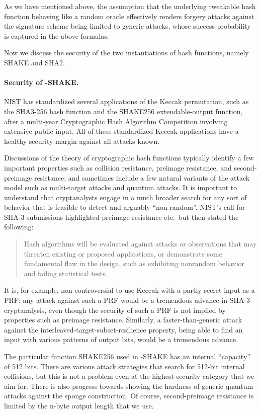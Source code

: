 As we have mentioned above, the assumption that the underlying tweakable hash function behaving like a random oracle effectively renders forgery attacks against the signature scheme being limited to generic attacks, whose success probability is captured in the above formulas. 

Now we discuss the security of the two instantiations of hash functions, namely \textsf{SHAKE} and \textsf{SHA2}.

\paragraph{Security of \SPHINCSA-SHAKE.}

NIST has standardized several applications of the Keccak permutation, such as the SHA3-256 hash function and the SHAKE256 extendable-output function, after a multi-year Cryptographic Hash Algorithm Competition involving extensive public input. All of these standardized Keccak applications have a healthy security margin against all attacks known.

Discussions of the theory of cryptographic hash functions typically identify a few important properties such as collision resistance, preimage resistance, and second-preimage resistance; and sometimes include a few natural variants of the attack model such as multi-target attacks and quantum attacks. It is important to understand that cryptanalysts engage in a much broader search for any sort of behavior that is feasible to detect and arguably ``non-random''. NIST's call for SHA-3 submissions highlighted preimage resistance etc.~but then stated the following:

\begin{quote}
    Hash algorithms will be evaluated against attacks or observations that may threaten existing or proposed applications, or demonstrate some fundamental flaw in the design, such as exhibiting nonrandom behavior and failing statistical tests.
\end{quote}
It is, for example, non-controversial to use Keccak with a partly secret input as a PRF: any attack against such a PRF would be a tremendous advance in SHA-3 cryptanalysis, even though the security of such a PRF is not implied by properties such as preimage resistance. Similarly, a faster-than-generic attack against the interleaved-target-subset-resilience property, being able to find an input with various patterns of output bits, would be a tremendous advance.

The particular function SHAKE256 used in \SPHINCSA-SHAKE has an internal “capacity” of 512 bits. There are various attack strategies that search for 512-bit internal collisions, but this is not a problem even at the highest security category that we aim for. There is also progress towards showing the hardness of generic quantum attacks against the sponge construction. Of course, second-preimage resistance is limited by the n-byte output length that we use.


